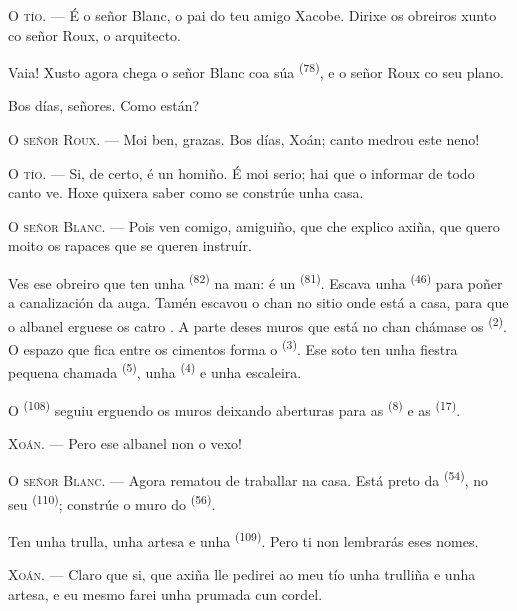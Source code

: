 \textsc{O tío}. --- É o señor Blanc, o pai do teu amigo Xacobe. Dirixe os obreiros xunto co
señor Roux, o arquitecto.

Vaia! Xusto agora chega o señor Blanc coa súa  \textsuperscript{(78)}, e o señor
Roux co seu plano.

Bos días, señores. Como están?

\textsc{O señor Roux}. --- Moi ben, grazas. Bos días, Xoán; canto medrou este neno!

\textsc{O tío}. --- Si, de certo, é un homiño. É moi serio; hai que o informar de todo canto
ve. Hoxe quixera saber como se constrúe unha casa.

\VUsaut{3.0mm}

\textsc{O señor Blanc}. --- Pois ven comigo, amiguiño, que che explico axiña, que quero moito
os rapaces que se queren instruír.

Ves ese obreiro que ten unha  \textsuperscript{(82)} na man: é un
 \textsuperscript{(81)}. Escava unha 
\textsuperscript{(46)} para poñer a canalización da auga. Tamén escavou o chan no sitio onde
está a casa, para que o albanel erguese os catro . A parte deses muros que está
no chan chámase os  \textsuperscript{(2)}. O espazo que fica entre os
cimentos forma o  \textsuperscript{(3)}. Ese soto ten unha fiestra pequena
chamada  \textsuperscript{(5)}, unha
 \textsuperscript{(4)} e unha escaleira.

O  \textsuperscript{(108)} seguiu erguendo os muros deixando aberturas para as
 \textsuperscript{(8)} e as  \textsuperscript{(17)}.

\textsc{Xoán}. --- Pero ese albanel non o vexo!

\textsc{O señor Blanc}. --- Agora rematou de traballar na casa. Está preto da
 \textsuperscript{(54)}, no seu 
\textsuperscript{(110)}; constrúe o muro do  \textsuperscript{(56)}.

Ten unha trulla, unha artesa e unha  \textsuperscript{(109)}. Pero ti non
lembrarás eses nomes.

\textsc{Xoán}. --- Claro que si, que axiña lle pedirei ao meu tío unha trulliña e unha artesa,
e eu mesmo farei unha prumada cun cordel.

